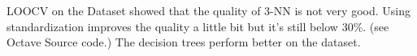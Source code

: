 LOOCV on the Dataset showed that the quality of 3-NN is not very good.
Using standardization improves the quality a little bit but it's still below 30\%.
(see Octave Source code.) 
The decision trees perform better on the dataset.
 
 